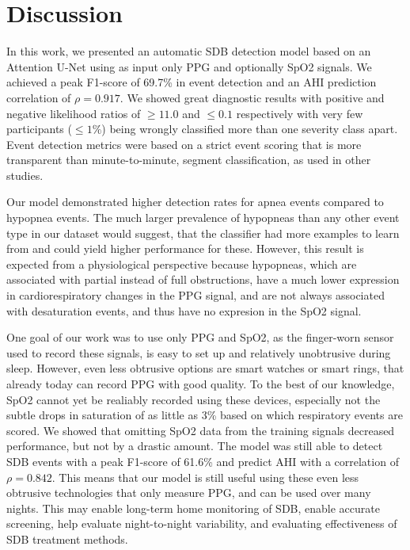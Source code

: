 \chapter{Discussion \label{Chapter-Discussion}}


In this work, we presented an automatic SDB detection model based on an Attention U-Net using as input only PPG and optionally SpO2 signals. We achieved a peak F1-score of 69.7\% in event detection and an AHI prediction correlation of $\rho = 0.917$. We showed great diagnostic results with positive and negative likelihood ratios of $\ge 11.0$ and $\le 0.1$ respectively with very few participants ($\le 1\%$) being wrongly classified more than one severity class apart. Event detection metrics were based on a strict event scoring that is more transparent than minute-to-minute, segment classification, as used in other studies.

Our model demonstrated higher detection rates for apnea events compared to hypopnea events. The much larger prevalence of hypopneas than any other event type in our dataset would suggest, that the classifier had more examples to learn from and could yield higher performance for these. However, this result is expected from a physiological perspective because hypopneas, which are associated with partial instead of full obstructions, have a much lower expression in cardiorespiratory changes in the PPG signal, and are not always associated with desaturation events, and thus have no expresion in the SpO2 signal.

One goal of our work was to use only PPG and SpO2, as the finger-worn sensor used to record these signals, is easy to set up and relatively unobtrusive during sleep. However, even less obtrusive options are smart watches or smart rings, that already today can record PPG with good quality. To the best of our knowledge, SpO2 cannot yet be realiably recorded using these devices, especially not the subtle drops in saturation of as little as 3\% based on which respiratory events are scored. 
We showed that omitting SpO2 data from the training signals decreased performance, but not by a drastic amount. The model was still able to detect SDB events with a peak F1-score of 61.6\% and predict AHI with a correlation of $\rho = 0.842$. This means that our model is still useful using these even less obtrusive technologies that only measure PPG, and can be used over many nights. This may enable long-term home monitoring of SDB, enable accurate screening, help evaluate night-to-night variability, and evaluating effectiveness of SDB treatment methods.

